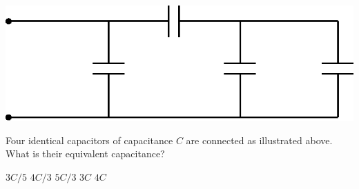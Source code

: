 \begin{center}
\includegraphics[scale=0.25]{images/img-009-016.png}
\end{center}

\begin{questions}\setcounter{question}{17}\question
Four identical capacitors of capacitance $C$ are connected as illustrated above. What is their equivalent capacitance?

\begin{oneparchoices}
\choice $3 C / 5$
\choice $4 C / 3$
\choice $5 C / 3$
\choice $3 C$
\choice $4 C$
\end{oneparchoices}\end{questions}

